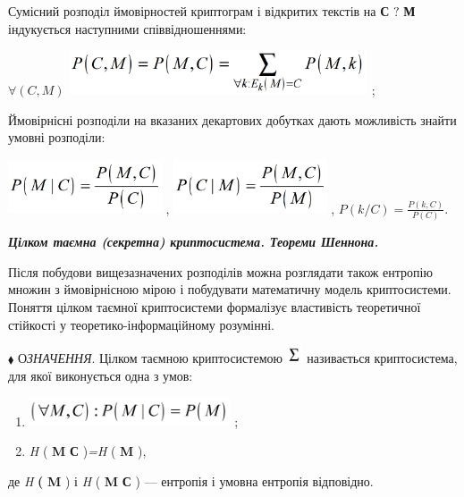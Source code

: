 Сумісний розподіл ймовірностей  криптограм і відкритих текстів на  \textbf{С}
${?}$ \textbf{М}  індукується наступними співвідношеннями:


\bigskip

{\centering
 ${\forall (C,M)}$   
\includegraphics[width=3.478in,height=0.5209in]{crypt-img/crypt-img19.png} ;
\par}

Ймовірнісні розподіли на вказаних декартових добутках дають можливість знайти
умовні розподіли:

{\centering
 \includegraphics[width=1.7902in,height=0.6354in]{crypt-img/crypt-img20.png} ,  
\includegraphics[width=1.7874in,height=0.6335in]{crypt-img/crypt-img21.png} ,  
${P(k/C)=\frac{P(k,C)}{P(C)}}$.
\par}


\bigskip


\bigskip

{\centering\bfseries\itshape
Цілком таємна (секретна)  криптосистема. Теореми  Шеннона.
\par}


\bigskip


\bigskip

Після побудови вищезазначених розподілів можна розглядати також  ентропію множин
з ймовірнісною мірою і побудувати математичну модель криптосистеми. Поняття
цілком таємної криптосистеми формалізує властивість теоретичної стійкості у
теоретико-інформаційному розумінні.


\bigskip

${\blacklozenge}$ О\textit{ЗНАЧЕННЯ}. Цілком таємною криптосистемою 
\includegraphics[width=0.1882in,height=0.2008in]{crypt-img/crypt-img22.png} 
називається криптосистема, для якої виконується одна з умов:

\liststyleWWviiiNumxliii
\begin{enumerate}
\item 
\includegraphics[width=2.3417in,height=0.3346in]{crypt-img/crypt-img23.png} ;
\item  \textit{H}\textit{ }( \textbf{M} {\textbar} \textbf{С}
)\textit{=}\textit{H}\textit{ }( \textbf{M} ), 
\end{enumerate}
де  \textit{H} \textbf{( }\textbf{M} )  і  \textit{H} (  \textbf{M}\textbf{
{\textbar} С} ) --- ентропія і  умовна ентропія відповідно.

